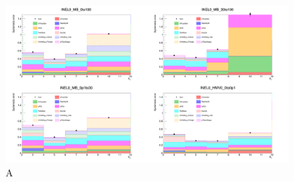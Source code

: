 \begin{figure}
    \centering
    \includegraphics[width=0.95\textwidth]{plots/s3_SystErr_2to12.png}
    \caption{A}
    \label{fig:s3_systErr}
\end{figure}

